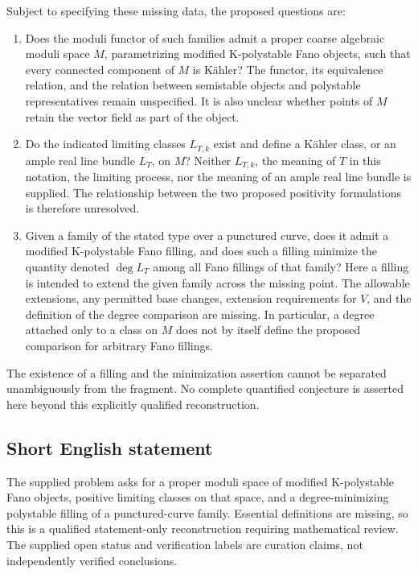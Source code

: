 \documentclass[11pt]{article}
\begin{document}
Subject to specifying these missing data, the proposed questions are:
\begin{enumerate}
\item Does the moduli functor of such families admit a proper coarse algebraic moduli space \(M\), parametrizing modified K-polystable Fano objects, such that every connected component of \(M\) is K\"ahler? The functor, its equivalence relation, and the relation between semistable objects and polystable representatives remain unspecified. It is also unclear whether points of \(M\) retain the vector field as part of the object.
\item Do the indicated limiting classes \(L_{T,k}\) exist and define a K\"ahler class, or an ample real line bundle \(L_T\), on \(M\)? Neither \(L_{T,k}\), the meaning of \(T\) in this notation, the limiting process, nor the meaning of an ample real line bundle is supplied. The relationship between the two proposed positivity formulations is therefore unresolved.
\item Given a family of the stated type over a punctured curve, does it admit a modified K-polystable Fano filling, and does such a filling minimize the quantity denoted \(\deg L_T\) among all Fano fillings of that family? Here a filling is intended to extend the given family across the missing point. The allowable extensions, any permitted base changes, extension requirements for \(V\), and the definition of the degree comparison are missing. In particular, a degree attached only to a class on \(M\) does not by itself define the proposed comparison for arbitrary Fano fillings.
\end{enumerate}
The existence of a filling and the minimization assertion cannot be separated unambiguously from the fragment. No complete quantified conjecture is asserted here beyond this explicitly qualified reconstruction.
\subsection{Short English statement}
The supplied problem asks for a proper moduli space of modified K-polystable Fano objects, positive limiting classes on that space, and a degree-minimizing polystable filling of a punctured-curve family. Essential definitions are missing, so this is a qualified statement-only reconstruction requiring mathematical review. The supplied open status and verification labels are curation claims, not independently verified conclusions.
\end{document}
